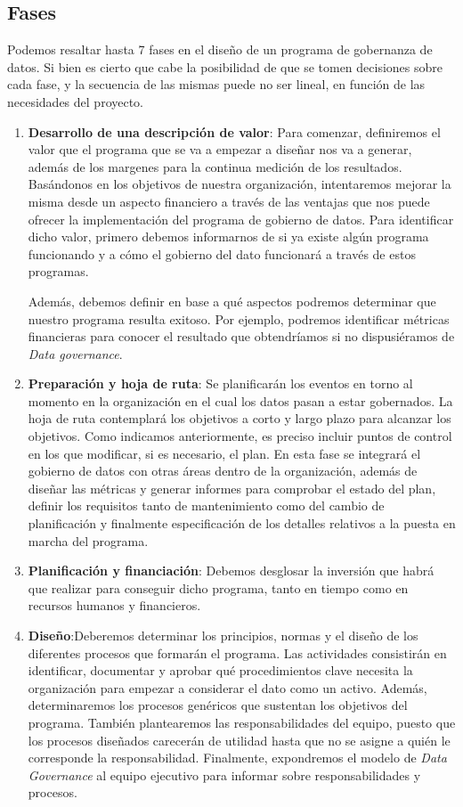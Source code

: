 \documentclass{article}
\begin{document}
\subsection{Fases}
Podemos resaltar hasta 7 fases en el diseño de un programa de gobernanza de datos. Si bien es cierto que cabe la posibilidad de que se tomen decisiones sobre cada fase, y la secuencia de las mismas puede no ser lineal, en función de las necesidades del proyecto.
\begin{enumerate}
	\item \textbf{Desarrollo de una descripción de valor}: Para comenzar, definiremos el valor que el programa que se va a empezar a diseñar nos va a generar, además de los margenes para la continua medición de los resultados. Basándonos en los objetivos de nuestra organización, intentaremos mejorar la misma desde un aspecto financiero a través de las ventajas que nos puede ofrecer la implementación del programa de gobierno de datos. Para identificar dicho valor, primero debemos informarnos de si ya existe algún programa funcionando y a cómo el gobierno del dato funcionará a través de estos programas.
	
	Además, debemos definir en base a qué aspectos podremos determinar que nuestro programa resulta exitoso. Por ejemplo, podremos identificar métricas financieras para conocer el resultado que obtendríamos si no dispusiéramos de \textit{Data governance}.
	
	\item \textbf{Preparación y hoja de ruta}: Se planificarán los eventos en torno al momento en la organización en el cual los datos pasan a estar gobernados. La hoja de ruta contemplará los objetivos a corto y largo plazo para alcanzar los objetivos. Como indicamos anteriormente, es preciso incluir puntos de control en los que modificar, si es necesario, el plan.
	En esta fase se integrará el gobierno de datos con otras áreas dentro de la organización, además de diseñar las métricas y generar informes para comprobar el estado del plan, definir los requisitos tanto de mantenimiento como del cambio de planificación y finalmente especificación de los detalles relativos a la puesta en marcha del programa.
	
	\item \textbf{Planificación y financiación}:
	Debemos desglosar la inversión que habrá que realizar para conseguir dicho programa, tanto en tiempo como en recursos humanos y financieros. 

	\item \textbf{Diseño}:Deberemos determinar los principios, normas y el diseño de los diferentes procesos que formarán el programa. Las actividades consistirán en identificar, documentar y aprobar qué procedimientos clave necesita la organización para empezar a considerar el dato como un activo. Además, determinaremos los procesos genéricos que sustentan los objetivos del programa. También plantearemos las responsabilidades del equipo, puesto que los procesos diseñados carecerán de utilidad hasta que no se asigne a quién le corresponde la responsabilidad. Finalmente, expondremos el modelo de \textit{Data Governance} al equipo ejecutivo para informar sobre responsabilidades y procesos.
	

\end{enumerate}
\end{document}

